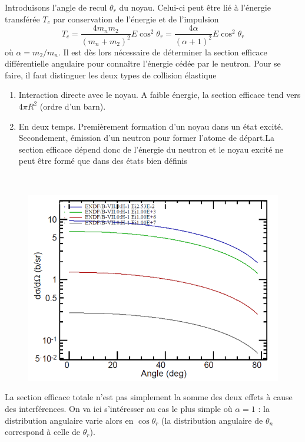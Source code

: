 Introduisons l'angle de recul $\theta_r$ du noyau. Celui-ci peut être lié à l'énergie transférée
$T_c$ par conservation de l'énergie et de l'impulsion
\begin{equation}
T_{c}=\frac{4m_nm_2}{(m_n+m_2)^2}E\cos^2\theta_r = \frac{4\alpha}{(\alpha+1)^2}E\cos^2\theta_r
\end{equation}
où $\alpha = m_2/m_n$. Il est dès lors nécessaire de déterminer la section efficace différentielle
angulaire pour connaître l'énergie cédée par le neutron. Pour se faire, il faut distinguer les 
deux types de collision élastique
\begin{enumerate}
\item Interaction directe avec le noyau. A faible énergie, la section efficace tend vers $4\pi R^2$ 
(ordre d'un barn).
\item En deux temps. Premièrement formation d'un noyau dans un état excité. Secondement, émission d'un 
neutron pour former l'atome de départ.La section efficace dépend donc de l'énergie du neutron et 
le noyau excité ne peut être formé que dans des états bien définis
\end{enumerate}\ \\


	\begin{figure}
	\vspace{-5mm}
	\includegraphics[scale=0.3]{ch5/image2}
	\end{figure}
	
La section efficace totale n'est pas simplement la somme des deux effets à cause des interférences. 
On va ici s'intéresser au cas le plus simple où $\alpha=1$ : la distribution angulaire varie alors
en $\cos\theta_r$ (la distribution angulaire de $\theta_n$ correspond à celle de $\theta_r$).\\

